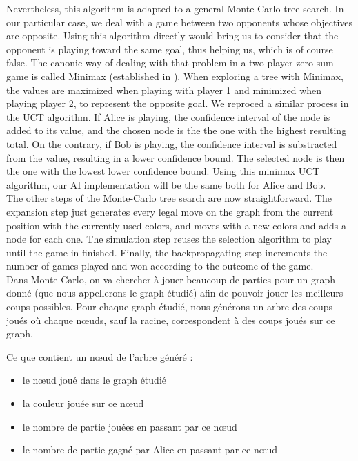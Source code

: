 Nevertheless, this algorithm is adapted to a general Monte-Carlo tree search. In our particular case, we deal with a game between two opponents whose objectives are opposite. Using this algorithm directly would bring us to consider that the opponent is playing toward the same goal, thus helping us, which is of course false. The canonic way of dealing with that problem in a two-player zero-sum game is called Minimax (established in \cite{Minimax}). When exploring a tree with Minimax, the values are maximized when playing with player 1 and minimized when playing player 2, to represent the opposite goal. We reproced a similar process in the UCT algorithm. If Alice is playing, the confidence interval of the node is added to its value, and the chosen node is the the one with the highest resulting total. On the contrary, if Bob is playing, the confidence interval is substracted from the value, resulting in a lower confidence bound. The selected node is then the one with the lowest lower confidence bound.
Using this minimax UCT algorithm, our AI implementation will be the same both for Alice and Bob.\\

The other steps of the Monte-Carlo tree search are now straightforward. The expansion step just generates every legal move on the graph from the current position with the currently used colors, and moves with a new colors and adds a node for each one. The simulation step reuses the selection algorithm to play until the game in finished. Finally, the backpropagating step increments the number of games played and won according to the outcome of the game.\\

Dans Monte Carlo, on va chercher à jouer beaucoup de parties pour un graph donné (que nous appellerons le graph étudié) afin de pouvoir jouer les meilleurs coups possibles. 
Pour chaque graph étudié, nous générons un arbre des coups joués où chaque nœuds, sauf la racine, correspondent à des coups joués sur ce graph. 

Ce que contient un nœud de l’arbre généré : 
\begin{itemize}
\item le nœud joué dans le graph étudié
\item la couleur jouée sur ce nœud 
\item le nombre de partie jouées en passant par ce nœud 
\item le nombre de partie gagné par Alice en passant par ce nœud
\end{itemize}

